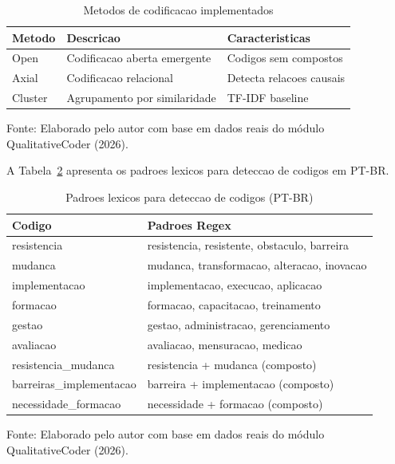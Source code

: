 \begin{table}[htbp]
    \centering
    \caption{Metodos de codificacao implementados}
    \label{tab:qc_metodos}
    \small
    \begin{tabular}{lp{4cm}p{4cm}}
        \toprule
        \textbf{Metodo} & \textbf{Descricao} & \textbf{Caracteristicas} \\
        \midrule
        Open & Codificacao aberta emergente & Codigos sem compostos \\
        Axial & Codificacao relacional & Detecta relacoes causais \\
        Cluster & Agrupamento por similaridade & TF-IDF baseline \\
        \bottomrule
    \end{tabular}
    \par\medskip
    \footnotesize{Fonte: Elaborado pelo autor com base em dados reais do módulo QualitativeCoder (2026).}
\end{table}

A Tabela~\ref{tab:qc_padroes} apresenta os padroes lexicos para deteccao de codigos em PT-BR.

\begin{table}[htbp]
    \centering
    \caption{Padroes lexicos para deteccao de codigos (PT-BR)}
    \label{tab:qc_padroes}
    \footnotesize
    \begin{tabular}{ll}
        \toprule
        \textbf{Codigo} & \textbf{Padroes Regex} \\
        \midrule
        resistencia & resistencia, resistente, obstaculo, barreira \\
        mudanca & mudanca, transformacao, alteracao, inovacao \\
        implementacao & implementacao, execucao, aplicacao \\
        formacao & formacao, capacitacao, treinamento \\
        gestao & gestao, administracao, gerenciamento \\
        avaliacao & avaliacao, mensuracao, medicao \\
        resistencia\_mudanca & resistencia + mudanca (composto) \\
        barreiras\_implementacao & barreira + implementacao (composto) \\
        necessidade\_formacao & necessidade + formacao (composto) \\
        \bottomrule
    \end{tabular}
    \par\medskip
    \footnotesize{Fonte: Elaborado pelo autor com base em dados reais do módulo QualitativeCoder (2026).}
\end{table}


